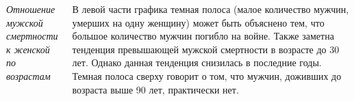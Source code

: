 \documentclass[25pt, a1paper, landscape]{tikzposter}
\begin{document}
\begin{columns}
{       \qquad\textit{Отношение мужской смертности к женской по возрастам}

\qquad В левой части графика темная полоса (малое количество мужчин, умерших на одну женщину) может быть объяснено тем, что большое количество мужчин погибло на войне. Также заметна тенденция превышающей мужской смертности в возрасте до 30 лет. Однако данная тенденция снизилась в последние годы. Темная полоса сверху говорит о том, что мужчин, доживших до возраста выше 90 лет, практически нет.

  

        }
    
    
\end{columns}
\end{document}
